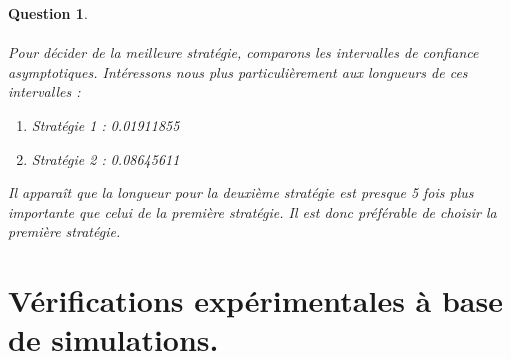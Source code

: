 \documentclass[a4paper,11pt]{article}
\newtheorem{exo3}{Question}
\begin{document}
\begin{exo3} \ \\ \\
Pour décider de la meilleure stratégie, comparons les intervalles de confiance asymptotiques. Intéressons nous plus particulièrement aux longueurs de ces intervalles : 
\begin{enumerate}
    \item Stratégie 1 : 0.01911855
    \item Stratégie 2 : 0.08645611
\end{enumerate}

Il apparaît que la longueur pour la deuxième stratégie est presque 5 fois plus importante que celui de la première stratégie. \newline \newline Il est donc préférable de choisir la première stratégie.
\end{exo3}

\newpage

\section{Vérifications expérimentales à base de simulations.}
\end{document}
